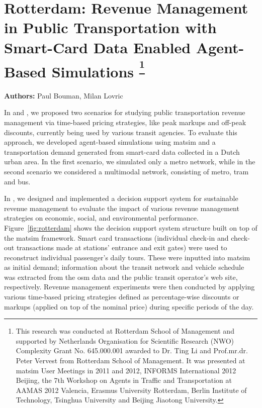\chapter{Rotterdam: Revenue Management in Public Transportation with Smart-Card Data Enabled Agent-Based Simulations \textsuperscript{\footnotesize{\footnote{This research was conducted at Rotterdam School of Management and
supported by Netherlands Organisation for Scientific Research (NWO)
Complexity Grant No. 645.000.001 awarded to Dr. Ting Li and Prof.mr.dr. Peter Vervest from
Rotterdam School of Management. It was presented at \protect\gls{matsim} User Meetings in 2011 and 2012,
INFORMS International 2012 Beijing, the 7th Workshop on Agents in Traffic and Transportation at
AAMAS 2012 Valencia, Erasmus University Rotterdam, Berlin Institute of Technology, Tsinghua
University and Beijing Jiaotong University.}}}}
\label{ch:rotterdam}
\hfill \textbf{Authors:} Paul Bouman, Milan Lovric


In \citet[][]{LovricEtAl_DSS_2013} and \citet[][]{BoumanEtAl_AAMAS_2012}, we proposed two scenarios for studying public transportation revenue management via time-based pricing strategies, like peak markups and off-peak discounts, currently being used by various transit agencies. To evaluate this approach, we developed agent-based simulations using \gls{matsim} and a transportation demand generated from smart-card data collected in a Dutch urban area. In the first scenario, we simulated only a metro network, while in the second scenario we considered a \gls{multimodal} network, consisting of metro, tram and bus.

In \citet[][]{LovricEtAl_DSS_2013}, we designed and implemented a decision support system for sustainable revenue management to evaluate the impact of various revenue management strategies on economic, social, and environmental performance. Figure~\ref{fig:rotterdam} shows the decision support system structure built on top of the \gls{matsim} framework. Smart card transactions (individual check-in and check-out transactions made at stations' entrance and exit gates) were used to reconstruct individual passenger's daily tours. These were inputted into \gls{matsim} as initial demand; information about the transit network and vehicle schedule was extracted from the \gls{osm} data and the public transit operator's web site, respectively. Revenue management experiments were then conducted by applying various time-based pricing strategies defined as percentage-wise discounts or markups (applied on top of the nominal price) during specific periods of the day. 

